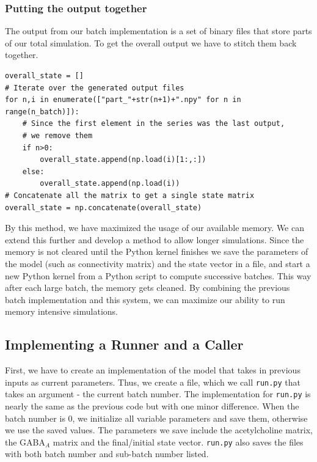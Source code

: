 \documentclass[10pt,letterpaper]{article}
\begin{document}
\subsubsection*{Putting the output together}

The output from our batch implementation is a set of binary files that store parts of our total simulation. To get the overall output we have to stitch them back together.

\begin{verbatim}
overall_state = []
# Iterate over the generated output files
for n,i in enumerate(["part_"+str(n+1)+".npy" for n in range(n_batch)]):
    # Since the first element in the series was the last output, 
    # we remove them
    if n>0:
        overall_state.append(np.load(i)[1:,:])
    else:
        overall_state.append(np.load(i))
# Concatenate all the matrix to get a single state matrix
overall_state = np.concatenate(overall_state)
\end{verbatim}

By this method, we have maximized the usage of our available memory. We can extend this further and develop a method to allow longer simulations. Since the memory is not cleared until the Python kernel finishes we save the parameters of the model (such as connectivity matrix) and the state vector in a file, and start a new Python kernel from a Python script to compute successive batches. This way after each large batch, the memory gets cleaned. By combining the previous batch implementation and this system, we can maximize our ability to run memory intensive simulations.

\subsection*{Implementing a Runner and a Caller}

First, we have to create an implementation of the model that takes in previous inputs as current parameters. Thus, we create a file, which we call \texttt{run.py} that takes an argument - the current batch number. The implementation for \texttt{run.py} is nearly the same as the previous code but with one minor difference. When the batch number is 0, we initialize all variable parameters and save them, otherwise we use the saved values. The parameters we save include the acetylcholine matrix, the GABA$_{A}$ matrix and the final/initial state vector. \texttt{run.py} also saves the files with both batch number and sub-batch number listed. 
\end{document}
